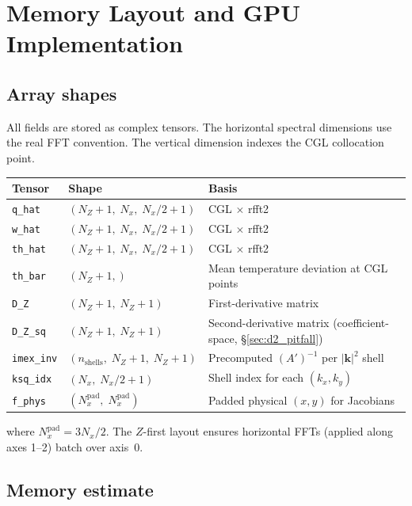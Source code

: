 \documentclass[11pt]{article}
\newcommand{\kh}{|\bm{k}|}
\begin{document}
\section{Memory Layout and GPU Implementation}
\label{sec:gpu}

\subsection{Array shapes}

All fields are stored as complex tensors. The horizontal spectral dimensions use the real FFT convention. The vertical dimension indexes the CGL collocation point.

\begin{center}
\begin{tabular}{lll}
\toprule
Tensor & Shape & Basis \\
\midrule
\texttt{q\_hat} & $(N_Z+1,\; N_x,\; N_x/2+1)$ & CGL $\times$ rfft2 \\
\texttt{w\_hat} & $(N_Z+1,\; N_x,\; N_x/2+1)$ & CGL $\times$ rfft2 \\
\texttt{th\_hat} & $(N_Z+1,\; N_x,\; N_x/2+1)$ & CGL $\times$ rfft2 \\
\texttt{th\_bar} & $(N_Z+1,)$ & Mean temperature deviation at CGL points \\
\midrule
\texttt{D\_Z} & $(N_Z+1,\; N_Z+1)$ & First-derivative matrix \\
\texttt{D\_Z\_sq} & $(N_Z+1,\; N_Z+1)$ & Second-derivative matrix (coefficient-space, \S\ref{sec:d2_pitfall}) \\
\texttt{imex\_inv} & $(n_{\mathrm{shells}},\; N_Z+1,\; N_Z+1)$ & Precomputed $(A')^{-1}$ per $\kh^2$ shell \\
\texttt{ksq\_idx} & $(N_x,\; N_x/2+1)$ & Shell index for each $(k_x, k_y)$ \\
\midrule
\texttt{f\_phys} & $(N_x^{\mathrm{pad}},\; N_x^{\mathrm{pad}})$ & Padded physical $(x,y)$ for Jacobians \\
\bottomrule
\end{tabular}
\end{center}
where $N_x^{\mathrm{pad}} = 3N_x/2$. The $Z$-first layout ensures horizontal FFTs (applied along axes 1--2) batch over axis~0.


\subsection{Memory estimate}
\end{document}
